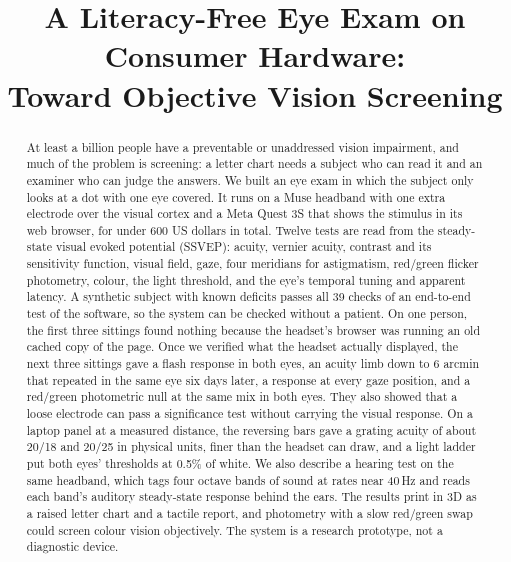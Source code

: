 \documentclass[conference]{IEEEtran}
\begin{document}
\title{A Literacy-Free Eye Exam on Consumer Hardware:\\ Toward Objective Vision Screening}

\author{
}

\maketitle

\begin{abstract}
At least a billion people have a preventable or unaddressed vision impairment, and much of the problem is screening: a letter chart needs a subject who can read it and an examiner who can judge the answers. We built an eye exam in which the subject only looks at a dot with one eye covered. It runs on a Muse headband with one extra electrode over the visual cortex and a Meta Quest 3S that shows the stimulus in its web browser, for under 600 US dollars in total. Twelve tests are read from the steady-state visual evoked potential (SSVEP): acuity, vernier acuity, contrast and its sensitivity function, visual field, gaze, four meridians for astigmatism, red/green flicker photometry, colour, the light threshold, and the eye's temporal tuning and apparent latency. A synthetic subject with known deficits passes all 39 checks of an end-to-end test of the software, so the system can be checked without a patient. On one person, the first three sittings found nothing because the headset's browser was running an old cached copy of the page. Once we verified what the headset actually displayed, the next three sittings gave a flash response in both eyes, an acuity limb down to 6 arcmin that repeated in the same eye six days later, a response at every gaze position, and a red/green photometric null at the same mix in both eyes. They also showed that a loose electrode can pass a significance test without carrying the visual response. On a laptop panel at a measured distance, the reversing bars gave a grating acuity of about 20/18 and 20/25 in physical units, finer than the headset can draw, and a light ladder put both eyes' thresholds at 0.5\% of white. We also describe a hearing test on the same headband, which tags four octave bands of sound at rates near 40\,Hz and reads each band's auditory steady-state response behind the ears. The results print in 3D as a raised letter chart and a tactile report, and photometry with a slow red/green swap could screen colour vision objectively. The system is a research prototype, not a diagnostic device.
\end{abstract}
\end{document}
